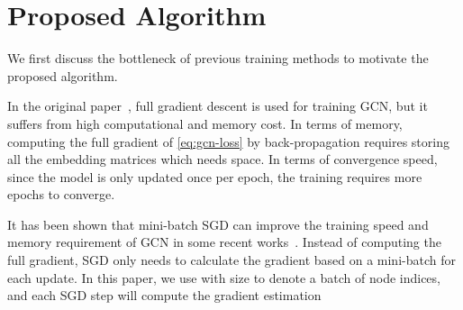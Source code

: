 \documentclass[sigconf]{acmart}
\begin{document}
\begin{table*}[t]
    \centering
        \caption{Time and space complexity of GCN training algorithms.  is number of layers,  is number of nodes,  is number of nonzeros in the adjacency matrix, and  is number of features. For simplicity we assume number of features is fixed for all layers. For SGD-based approaches,  is the batch size and  is the number of sampled neighbors per node. Note that due to the variance reduction technique, VR-GCN can work with a smaller  than GraphSAGE and FastGCN.
        For memory complexity,  is for storing  and the other term is for storing embeddings. For simplicity we omit the memory for storing the graph (GCN) or sub-graphs (other approaches) since they are fixed and usually not the main bottleneck.}
    \label{tab:complexity}
    \vspace{-10pt}

\end{table*}

\section{Proposed Algorithm}
\label{sec:algorithm}

We first discuss the bottleneck of previous training methods to motivate the proposed algorithm. 

In the original paper~\cite{kipf2017semi}, full gradient descent is used for training GCN, but it suffers from high computational and memory cost. In terms of memory, computing the full gradient of \eqref{eq:gcn-loss} by back-propagation requires storing all the embedding matrices  which needs  space. In terms of convergence speed, since the model is only updated once per epoch, the training requires more epochs to converge.



It has been shown that mini-batch SGD can improve the training speed and memory requirement of GCN in some recent works~\citep{hamilton2017inductive, chen2018fastgcn, chen2018stochastic}. 
Instead of computing the full gradient, SGD only needs to calculate the gradient based on a mini-batch for each update.
In this paper, we use   with size  to denote a batch of node indices, and each SGD step will compute the gradient estimation
\end{document}
